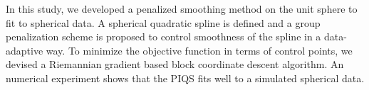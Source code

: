\documentclass[a0,portrait]{a0poster}
\begin{document}
\begin{multicols}{2}
In this study, we developed a penalized smoothing method on the unit sphere to fit to spherical data. A spherical quadratic spline is defined and a group penalization scheme is proposed to control smoothness of the spline in a data-adaptive way.
To minimize the objective function in terms of control points, we devised a Riemannian gradient based block coordinate descent algorithm.
An numerical experiment shows that the PIQS fits well to a simulated spherical data.



\end{multicols}
\end{document}
